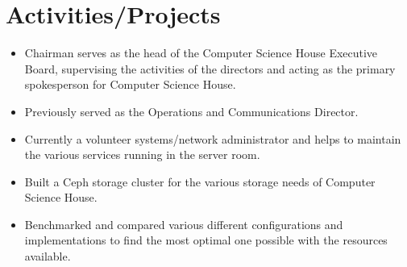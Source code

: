 \documentclass[]{deedy-resume-openfont}
\begin{document}
\begin{minipage}[t]{0.66\textwidth}
\vspace{-4mm}
\section{Activities/Projects}
\vspace{-3.5mm}
\begin{itemize}
  \itemsep-3pt
  \item Chairman serves as the head of the Computer Science House Executive Board, supervising the activities of the directors and acting as the primary spokesperson for Computer Science House.
  \item Previously served as the Operations and Communications Director.
  \item Currently a volunteer systems/network administrator and helps to maintain the various services running in the server room.
\end{itemize}
\sectionsep

\vspace{-5.5mm}

\vspace{-3mm}
\begin{itemize}
  \itemsep-4pt
  \item Built a Ceph storage cluster for the various storage needs of Computer Science House.
  \item Benchmarked and compared various different configurations and implementations to find the most optimal one possible with the resources available.
\end{itemize}
\vspace{-5.5mm}
\sectionsep


\end{minipage}
\end{document}
